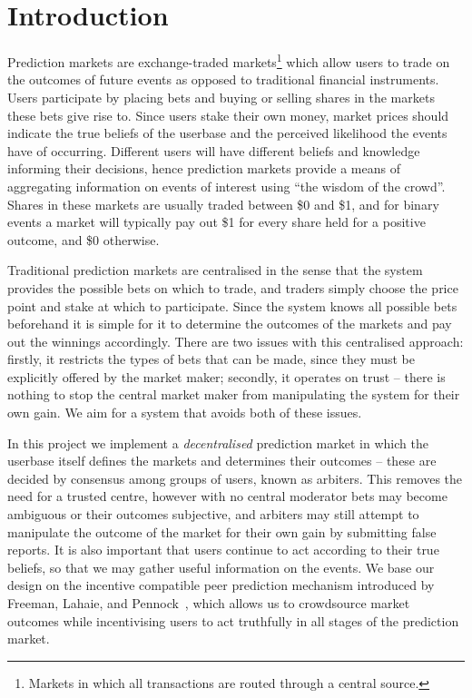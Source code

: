 \section{Introduction}

\label{sec:introduction}

Prediction markets are exchange-traded markets\footnote{Markets in which all
transactions are routed through a central source.} which allow users to trade
on the outcomes of future events as opposed to traditional financial
instruments. Users participate by placing bets and buying or selling shares in
the markets these bets give rise to. Since users stake their own money, market
prices should indicate the true beliefs of the userbase and the perceived
likelihood the events have of occurring. Different users will have different
beliefs and knowledge informing their decisions, hence prediction markets provide
a means of aggregating information on events of interest using ``the wisdom of
the crowd''. Shares in these markets are usually traded between \$0 and \$1,
and for binary events a market will typically pay out \$1 for every share held
for a positive outcome, and \$0 otherwise.

Traditional prediction markets are centralised in the sense that the system
provides the possible bets on which to trade, and traders simply choose the
price point and stake at which to participate. Since the system knows all
possible bets beforehand it is simple for it to determine the outcomes of the
markets and pay out the winnings accordingly. There are two issues with this
centralised approach: firstly, it restricts the types of bets that can be made,
since they must be explicitly offered by the market maker; secondly, it
operates on trust -- there is nothing to stop the central market maker from
manipulating the system for their own gain. We aim for a system that avoids
both of these issues.

In this project we implement a \emph{decentralised} prediction market in which
the userbase itself defines the markets and determines their outcomes -- these
are decided by consensus among groups of users, known as arbiters. This removes
the need for a trusted centre, however with no central moderator bets may
become ambiguous or their outcomes subjective, and arbiters may still attempt
to manipulate the outcome of the market for their own gain by submitting false
reports. It is also important that users continue to act according to their
true beliefs, so that we may gather useful information on the events. We base
our design on the incentive compatible peer prediction mechanism introduced by
Freeman, Lahaie, and Pennock~\cite{Freeman2017}, which allows us to crowdsource
market outcomes while incentivising users to act truthfully in all stages of
the prediction market.

